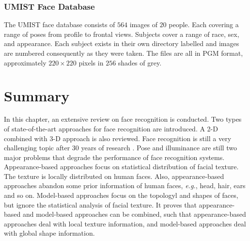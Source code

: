 \subsubsection{UMIST Face Database}
The UMIST face database \cite{Graham1998} consists of $564$ images of $20$ people. Each covering a range of poses from profile to frontal views. Subjects cover a range of race, sex, and appearance. Each subject exists in their own directory labelled and images are numbered consequently as they were taken. The files are all in PGM format, approximately $220 \times 220$ pixels in $256$ shades of grey.
\section{Summary}
In this chapter, an extensive review on face recognition is conducted. Two types of state-of-the-art approaches for face recognition are introduced. A 2-D combined with 3-D approach is also reviewed. Face recognition is still a very challenging topic after 30 years of research \cite{Zhao2003}. Pose and illuminance are still two major problems that degrade the performance of face recognition systems. Appearance-based approaches focus on statistical distribution of facial texture. The texture is locally distributed on human faces. Also, appearance-based approaches abandon some prior information of human faces, \textit{e.g.}, head, hair, ears and so on. Model-based approaches focus on the topologyl and shapes of faces, but ignore the statistical analysis of facial texture. It proves that appearance-based and model-based approaches can be combined, such that appearance-based approaches deal with local texture information, and model-based approaches deal with global shape information.



